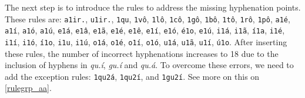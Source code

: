 
The next step is to introduce the rules to address the missing hyphenation points. These rules are: 
\texttt{a1ir.}, \texttt{u1ir.}, \texttt{1qu}, \texttt{1vô}, \texttt{1lô}, \texttt{1cô}, \texttt{1gô}, \texttt{1bô}, 
\texttt{1tô}, \texttt{1rô}, \texttt{1pô}, \texttt{a1é}, \texttt{a1í}, \texttt{a1ó}, \texttt{a1ú}, \texttt{e1á}, \texttt{e1â}, \texttt{e1ã}, 
\texttt{e1é}, \texttt{e1ê}, \texttt{e1í}, \texttt{e1ó}, \texttt{é1o}, \texttt{e1ú}, \texttt{i1á}, \texttt{i1ã}, \texttt{í1a}, \texttt{i1é}, 
\texttt{i1í}, \texttt{i1ó}, \texttt{í1o}, \texttt{i1u}, \texttt{i1ú}, \texttt{o1á}, \texttt{o1é}, \texttt{o1í}, \texttt{o1ó}, \texttt{u1á}, \texttt{u1ã}, 
\texttt{u1í}, \texttt{ú1o}.
After inserting these rules, the number of incorrect hyphenations increases to 18 due to the inclusion of hyphens in \emph{qu.í}, \emph{gu.í} and \emph{qu.á}. 
To overcome these errors, we need to add the exception rules: \texttt{1qu2á}, \texttt{1qu2í}, and \texttt{1gu2í}.
See more on this on \cref{rulegrp_aa}.

